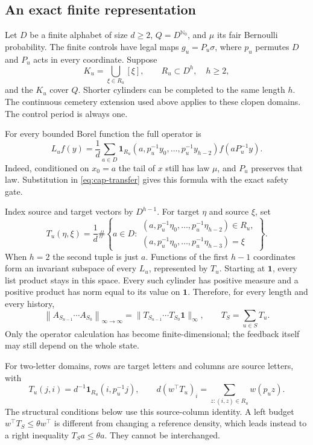 \documentclass[11pt,reqno]{amsart}
\numberwithin{equation}{section}
\theoremstyle{definition}
\theoremstyle{definition}
\newcommand{\Nzero}{\mathbb N_0}
\newcommand{\one}{\mathbf 1}
\newcommand{\opnorm}[1]{\left\|#1\right\|_{\infty\to\infty}}
\begin{document}
\subsection{An exact finite representation}
Let $D$ be a finite alphabet of size $d\ge2$, $Q=D^{\Nzero}$,
and $\mu$ its fair Bernoulli probability. The finite controls have
legal maps $g_u=P_u\sigma$, where $p_u$ permutes $D$ and $P_u$
acts in every coordinate. Suppose
\[
 K_u=\bigcup_{\xi\in R_u}[\xi],\qquad R_u\subset D^h,
 \quad h\ge2,
\]
and the $K_u$ cover $Q$. Shorter cylinders can be completed to the
same length $h$. The continuous cemetery extension used above
applies to these clopen domains. The control period is always one.

For every bounded Borel function the full operator is
\begin{equation}\label{eq:cyl-operator}
 L_uf(y)=\frac1d\sum_{a\in D}
 \one_{R_u}(a,p_u^{-1}y_0,\ldots,p_u^{-1}y_{h-2})
 f(aP_u^{-1}y).
\end{equation}
Indeed, conditioned on $x_0=a$ the tail of $x$ still has law $\mu$,
and $P_u$ preserves that law. Substitution in
\eqref{eq:cap-transfer} gives this formula with the exact safety gate.

Index source and target vectors by $D^{h-1}$. For target $\eta$
and source $\xi$, set
\begin{equation}\label{eq:cyl-matrix}
 T_u(\eta,\xi)=\frac1d\#\left\{a\in D:
 \begin{array}{l}
 (a,p_u^{-1}\eta_0,\ldots,p_u^{-1}\eta_{h-2})\in R_u,\\
 (a,p_u^{-1}\eta_0,\ldots,p_u^{-1}\eta_{h-3})=\xi
 \end{array}\right\}.
\end{equation}
When $h=2$ the second tuple is just $a$.
Functions of the first $h-1$ coordinates form an invariant subspace
of every $L_u$, represented by $T_u$. Starting at $\one$, every
list product stays in this space. Every such cylinder has positive
measure and a positive product has norm equal to its value on $\one$.
Therefore, for every length and every history,
\begin{equation}\label{eq:cyl-fullnorm}
 \opnorm{A_{S_{n-1}}\cdots A_{S_0}}
 =\|T_{S_{n-1}}\cdots T_{S_0}\one\|_\infty,
 \qquad T_S=\sum_{u\in S}T_u.
\end{equation}
Only the operator calculation has become finite-dimensional; the
feedback itself may still depend on the whole state.

For two-letter domains, rows are target letters and columns are
source letters, with
\begin{equation}\label{eq:cyl-two}
 T_u(j,i)=d^{-1}\one_{R_u}(i,p_u^{-1}j),\qquad
 d(w^\top T_u)_i=\sum_{z:(i,z)\in R_u}w(p_uz).
\end{equation}
The structural conditions below use this source-column identity.
A left budget $w^\top T_S\le\theta w^\top$ is different from
changing a reference density, which leads instead to a right
inequality $T_Sa\le\theta a$. They cannot be interchanged.
\end{document}

